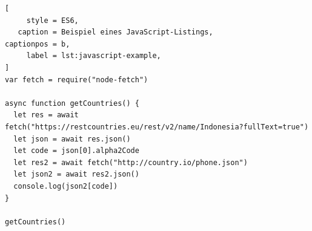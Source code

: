 \begin{lstlisting}[
     style = ES6,
   caption = Beispiel eines JavaScript-Listings,
captionpos = b,
     label = lst:javascript-example,
]
var fetch = require("node-fetch")

async function getCountries() {
  let res = await fetch("https://restcountries.eu/rest/v2/name/Indonesia?fullText=true")
  let json = await res.json()
  let code = json[0].alpha2Code
  let res2 = await fetch("http://country.io/phone.json")
  let json2 = await res2.json()
  console.log(json2[code])
}

getCountries()
\end{lstlisting}